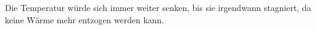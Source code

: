 Die Temperatur würde sich immer weiter senken, bis sie irgendwann stagniert, da keine Wärme mehr entzogen werden kann.
